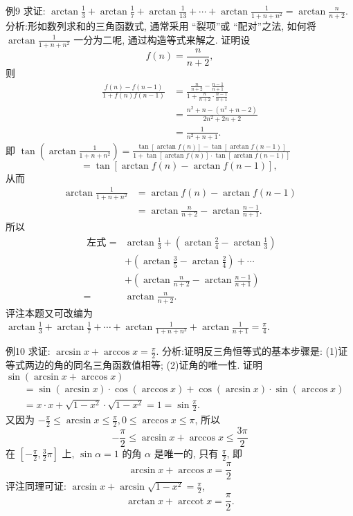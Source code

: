 例9 求证: $\arctan \frac{1}{3}+\arctan \frac{1}{7}+\arctan \frac{1}{13}+\cdots+\arctan \frac{1}{1+n+n^2}= \arctan \frac{n}{n+2}$.
分析:形如数列求和的三角函数式, 通常采用 “裂项”或 “配对”之法, 如何将 $\arctan \frac{1}{1+n+n^2}$ 一分为二呢, 通过构造等式来解之.
证明设
$$
f(n)=\frac{n}{n+2},
$$
则
$$
\begin{aligned}
\frac{f(n)-f(n-1)}{1+f(n) f(n-1)} & =\frac{\frac{n}{n+2}-\frac{n-1}{n+1}}{1+\frac{n}{n+2} \cdot \frac{n-1}{n+1}} \\
& =\frac{n^2+n-\left(n^2+n-2\right)}{2 n^2+2 n+2} \\
& =\frac{1}{n^2+n+1} .
\end{aligned}
$$
即 $\tan \left(\arctan \frac{1}{1+n+n^2}\right)=\frac{\tan [\arctan f(n)]-\tan [\arctan f(n-1)]}{1+\tan [\arctan f(n)] \cdot \tan [\arctan f(n-1)]}$
$$
=\tan [\arctan f(n)-\arctan f(n-1)] \text {, }
$$
从而
$$
\begin{aligned}
\arctan \frac{1}{1+n+n^2} & =\arctan f(n)-\arctan f(n-1) \\
& =\arctan \frac{n}{n+2}-\arctan \frac{n-1}{n+1} .
\end{aligned}
$$
所以
$$
\begin{aligned}
\text { 左式 }= & \arctan \frac{1}{3}+\left(\arctan \frac{2}{4}-\arctan \frac{1}{3}\right) \\
& +\left(\arctan \frac{3}{5}-\arctan \frac{2}{4}\right)+\cdots \\
& +\left(\arctan \frac{n}{n+2}-\arctan \frac{n-1}{n+1}\right) \\
= & \arctan \frac{n}{n+2} .
\end{aligned}
$$
评注本题又可改编为 $\arctan \frac{1}{3}+\arctan \frac{1}{7}+\cdots+\arctan \frac{1}{1+n+n^2}+ \arctan \frac{1}{n+1}=\frac{\pi}{4}$.



例10 求证: $\arcsin x+\arccos x=\frac{\pi}{2}$.
分析:证明反三角恒等式的基本步骤是: (1)证等式两边的角的同名三角函数值相等; (2)证角的唯一性.
证明 $\sin (\arcsin x+\arccos x)$
$$
\begin{aligned}
& =\sin (\arcsin x) \cdot \cos (\arccos x)+\cos (\arcsin x) \cdot \sin (\arccos x) \\
& =x \cdot x+\sqrt{1-x^2} \cdot \sqrt{1-x^2}=1=\sin \frac{\pi}{2} .
\end{aligned}
$$
又因为 $-\frac{\pi}{2} \leqslant \arcsin x \leqslant \frac{\pi}{2}, 0 \leqslant \arccos x \leqslant \pi$, 所以
$$
-\frac{\pi}{2} \leqslant \arcsin x+\arccos x \leqslant \frac{3 \pi}{2}
$$
在 $\left[-\frac{\pi}{2}, \frac{3}{2} \pi\right]$ 上, $\sin \alpha=1$ 的角 $\alpha$ 是唯一的, 只有 $\frac{\pi}{2}$, 即
$$
\arcsin x+\arccos x=\frac{\pi}{2}
$$
评注同理可证: $\arcsin x+\arcsin \sqrt{1-x^2}=\frac{\pi}{2}$,
$$
\arctan x+\operatorname{arccot} x=\frac{\pi}{2} .
$$



